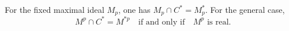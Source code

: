 For the fixed maximal ideal $M_p$, one has $M_p \cap C^* = M^*_p$. For the general case,
$$M^p \cap C^* = M^{*p} \quad \text{if and only if} \quad M^p \text{ is real}.$$
